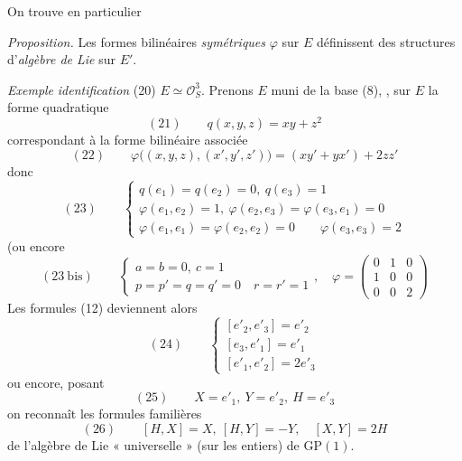 \documentclass[11pt,a4paper]{article}
\begin{document}
On trouve en particulier

\emph{Proposition.} Les formes bilinéaires \emph{symétriques} $\varphi$ sur $E$
définissent des structures d'\emph{algèbre de Lie} sur $E'$.

\emph{Exemple} \emph{identification} (20) $E \simeq \mathcal{O}_S^3$. Prenons
$E$ muni de la base (8),  \struck{\ill{}},  sur $E$
la forme quadratique
\[
  (21) \qquad q(x, y, z) = xy + z^2
\]
correspondant à la forme bilinéaire associée
\[
  (22) \qquad \varphi\bigl((x, y, z), (x', y', z')\bigr) = (xy' + yx') + 2zz'
\]
donc
\[
  (23) \qquad
  \begin{cases}
    q(e_1) = q(e_2) = 0 ,\ q(e_3) = 1 \\
    \varphi(e_1, e_2) = 1 ,\ \varphi(e_2, e_3) = \varphi(e_3, e_1) = 0 \\
    \varphi(e_1, e_1) = \varphi(e_2, e_2) = 0 \qquad \varphi(e_3, e_3) = 2
  \end{cases}
\]
(ou encore
\[
  (23\ \text{bis}) \qquad
  \begin{cases}
    a = b = 0 ,\ c = 1 \\
    p = p' = q = q' = 0 \quad r = r' = 1
  \end{cases} ,
  \quad \varphi = \begin{pmatrix} 0 & 1 & 0 \\ 1 & 0 & 0 \\ 0 & 0 & 2 \end{pmatrix}
\]
Les formules (12) deviennent alors \struck{\ill{}}
\[
  (24) \qquad
  \begin{cases}
    [e'_2, e'_3] = e'_2 \\
    [e_3, e'_1] = e'_1 \\
    [e'_1, e'_2] = 2e'_3
  \end{cases}
\]
ou encore, posant
\[
  (25) \qquad X = e'_1 ,\ Y = e'_2 ,\ H = e'_3
\]
on reconnaît les formules familières
\[
  (26) \qquad [H, X] = X ,\ [H, Y] = -Y ,\quad [X, Y] = 2H
\]
de l'algèbre de Lie  « universelle » (sur les entiers) de $\mathrm{GP}(1)$.
\end{document}
